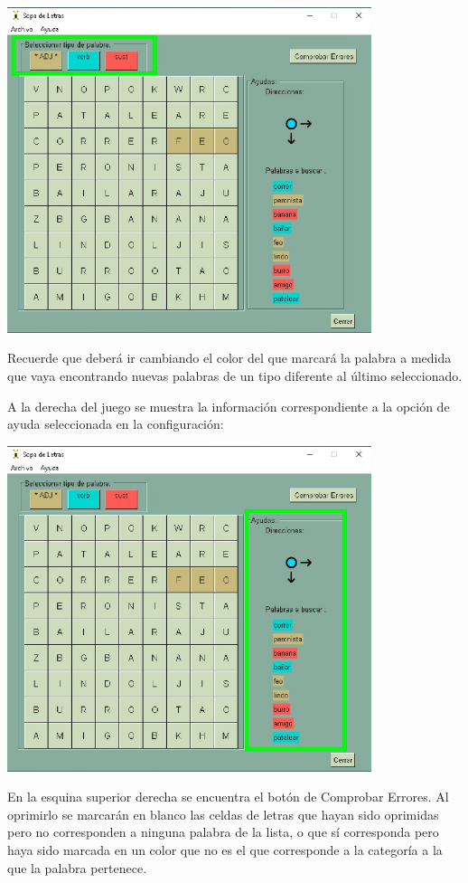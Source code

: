 \includegraphics[width=0.8\textwidth,keepaspectratio]{img/guia/12.jpg}

Recuerde que deberá ir cambiando el color del que marcará la palabra a medida que vaya encontrando nuevas palabras de un tipo diferente al último seleccionado.

A la derecha del juego se muestra la información correspondiente a la opción de ayuda seleccionada en la configuración:

\includegraphics[width=0.8\textwidth,keepaspectratio]{img/guia/13.jpg}

En la esquina superior derecha se encuentra el botón de Comprobar Errores. Al oprimirlo se marcarán en blanco las celdas de letras que hayan sido oprimidas pero no corresponden a ninguna palabra de la lista, o que sí corresponda pero haya sido marcada en un color que no es el que corresponde a la categoría a la que la palabra pertenece.

